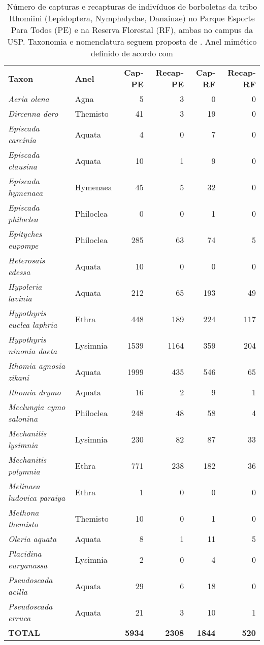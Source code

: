 \begin{table}
\caption{\label{tab:borb1} Número de capturas e recapturas de indivíduos 
de borboletas da tribo
Ithomiini (Lepidoptera, Nymphalydae, Danainae) no Parque
Esporte Para Todos (PE) e na Reserva Florestal (RF), ambas no campus da
USP. Taxonomia e nomenclatura seguem proposta de \citet{Brower_2014}. 
Anel mimético definido de acordo com \citet{Willmott_2004}}
\begin{tabular}{llrrrr}
  \textbf{Taxon} & \textbf{Anel} & \textbf{Cap-PE} & \textbf{Recap-PE} & \textbf{Cap-RF} & \textbf{Recap-RF}\\
  \emph{Aeria olena} & Agna & 5 & 3 & 0 & 0\\
  \emph{Dircenna dero} & Themisto & 41 & 3 & 19 & 0\\
  \emph{Episcada carcinia} & Aquata & 4 & 0 & 7 & 0\\
  \emph{Episcada clausina} & Aquata & 10 & 1 & 9 & 0\\
  \emph{Episcada hymenaea} & Hymenaea & 45 & 5 & 32 & 0\\
  \emph{Episcada philoclea} & Philoclea & 0 & 0 & 1 & 0\\
  \emph{Epityches eupompe} & Philoclea & 285 & 63 & 74 & 5\\
  \emph{Heterosais edessa} & Aquata & 10 & 0 & 0 & 0\\
  \emph{Hypoleria lavinia} & Aquata & 212 & 65 & 193 & 49\\
  \emph{Hypothyris euclea laphria} & Ethra & 448 & 189 & 224 & 117\\
  \emph{Hypothyris ninonia daeta} & Lysimnia & 1539 & 1164 & 359 & 204\\
  \emph{Ithomia agnosia zikani} & Aquata & 1999 & 435 & 546 & 65\\
  \emph{Ithomia drymo} & Aquata & 16 & 2 & 9 & 1\\
  \emph{Mcclungia cymo salonina} & Philoclea & 248 & 48 & 58 & 4\\
  \emph{Mechanitis lysimnia} & Lysimnia & 230 & 82 & 87 & 33\\
  \emph{Mechanitis polymnia} & Ethra & 771 & 238 & 182 & 36\\
  \emph{Melinaea ludovica paraiya} & Ethra & 1 & 0 & 0 & 0\\
  \emph{Methona themisto} & Themisto & 10 & 0 & 1 & 0\\
  \emph{Oleria aquata} & Aquata & 8 & 1 & 11 & 5\\
  \emph{Placidina euryanassa} & Lysimnia & 2 & 0 & 4 & 0\\
  \emph{Pseudoscada acilla} & Aquata & 29 & 6 & 18 & 0\\
  \emph{Pseudoscada erruca} & Aquata & 21 & 3 & 10 & 1\\
  \textbf{TOTAL} & & \textbf{5934} & \textbf{2308} & \textbf{1844} & \textbf{520}\\
\end{tabular} 
\end{table}